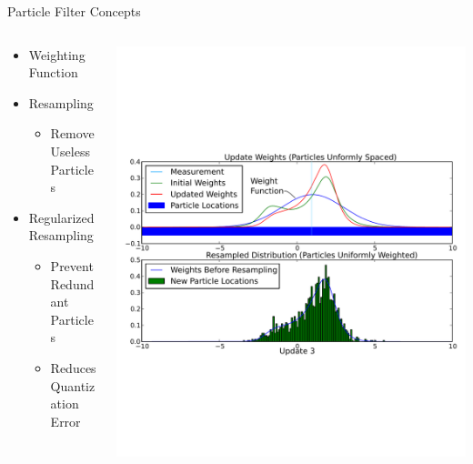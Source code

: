 \documentclass{beamer}
\begin{document}
\begin{frame}{Particle Filter Concepts}
\small
\begin{columns}
\begin{column}{.5\textwidth}
\begin{itemize}
    \item Weighting Function
    \item Resampling
    \begin{itemize}
        \item Remove Useless Particles
    \end{itemize}
    \item Regularized Resampling
    \begin{itemize}
        \item Prevent Redundant Particles
        \item Reduces Quantization Error
    \end{itemize}
\end{itemize}
\end{column}

\begin{column}{.5\textwidth}
\includegraphics[clip=true,trim=0cm 6cm 0cm 6cm,width=\textwidth]{particle_filter2}
\end{column}
\end{columns}
\end{frame}
\end{document}
